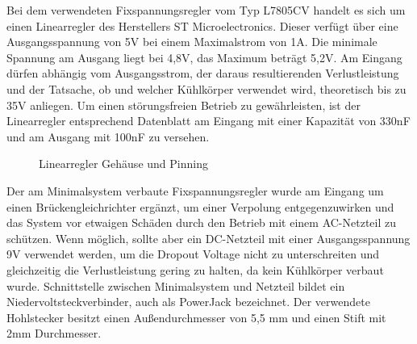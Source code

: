 Bei dem verwendeten Fixspannungsregler vom Typ L7805CV handelt es sich um einen Linearregler des Herstellers ST Microelectronics. Dieser verfügt über eine Ausgangsspannung von 5V bei einem Maximalstrom von 1A. Die minimale Spannung am Ausgang liegt bei 4,8V, das Maximum beträgt 5,2V. Am Eingang dürfen abhängig vom Ausgangsstrom, der daraus resultierenden Verlustleistung und der Tatsache, ob und welcher Kühlkörper verwendet wird, theoretisch bis zu 35V anliegen. Um einen störungsfreien Betrieb zu gewährleisten, ist der Linearregler entsprechend Datenblatt am Eingang mit einer Kapazität von 330nF und am Ausgang mit 100nF zu versehen.
\begin{figure}[H]
    \qquad
    \qquad
    \caption[Z80 Linearregler Gehäuse und Pinning]{Linearregler Gehäuse und Pinning \cite{z80:lin}}
    \label{fig:z80-lin-1}
\end{figure}
Der am Minimalsystem verbaute Fixspannungsregler wurde am Eingang um einen Brückengleichrichter ergänzt, um einer Verpolung entgegenzuwirken und das System vor etwaigen Schäden durch den Betrieb mit einem AC-Netzteil zu schützen. Wenn möglich, sollte aber ein DC-Netzteil mit einer Ausgangsspannung 9V verwendet werden, um die Dropout Voltage nicht zu unterschreiten und gleichzeitig die Verlustleistung gering zu halten, da kein Kühlkörper verbaut wurde. Schnittstelle zwischen Minimalsystem und Netzteil bildet ein Niedervoltsteckverbinder, auch als PowerJack bezeichnet. Der verwendete Hohlstecker besitzt einen Außendurchmesser von 5,5 mm und einen Stift mit 2mm Durchmesser.

